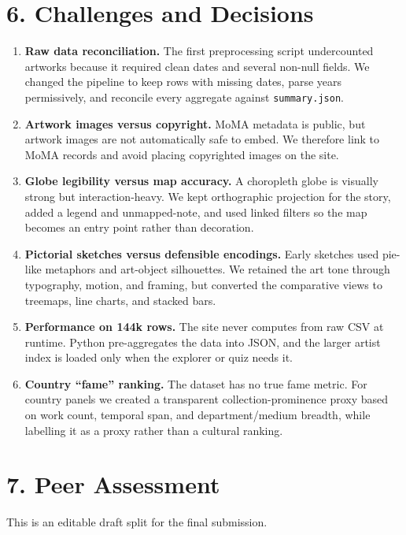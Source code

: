 \documentclass[10pt,a4paper]{article}
\begin{document}
\section*{6. Challenges and Decisions}
\begin{enumerate}
  \item \textbf{Raw data reconciliation.} The first preprocessing script undercounted artworks because it required clean dates and several non-null fields. We changed the pipeline to keep rows with missing dates, parse years permissively, and reconcile every aggregate against \texttt{summary.json}.
  \item \textbf{Artwork images versus copyright.} MoMA metadata is public, but artwork images are not automatically safe to embed. We therefore link to MoMA records and avoid placing copyrighted images on the site.
  \item \textbf{Globe legibility versus map accuracy.} A choropleth globe is visually strong but interaction-heavy. We kept orthographic projection for the story, added a legend and unmapped-note, and used linked filters so the map becomes an entry point rather than decoration.
  \item \textbf{Pictorial sketches versus defensible encodings.} Early sketches used pie-like metaphors and art-object silhouettes. We retained the art tone through typography, motion, and framing, but converted the comparative views to treemaps, line charts, and stacked bars.
  \item \textbf{Performance on 144k rows.} The site never computes from raw CSV at runtime. Python pre-aggregates the data into JSON, and the larger artist index is loaded only when the explorer or quiz needs it.
  \item \textbf{Country ``fame'' ranking.} The dataset has no true fame metric. For country panels we created a transparent collection-prominence proxy based on work count, temporal span, and department/medium breadth, while labelling it as a proxy rather than a cultural ranking.
\end{enumerate}

\section*{7. Peer Assessment}
This is an editable draft split for the final submission.
\end{document}
